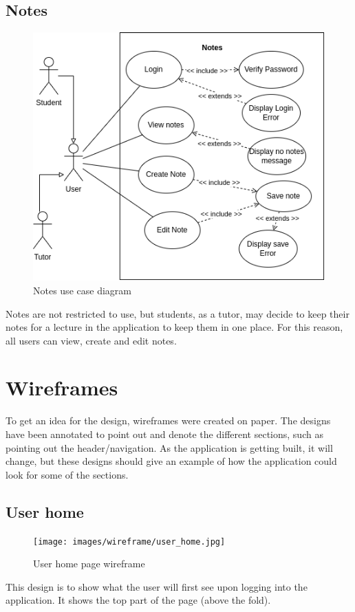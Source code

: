 \subsection{Notes}

\begin{figure}[H]
    \centering
    \includegraphics[scale=0.45]{images/use cases/notes.png}
    \caption{Notes use case diagram}
    \label{fig:my_label}
\end{figure}

Notes are not restricted to use, but students, as a tutor, may decide to keep their notes for a lecture in the application to keep them in one place. For this reason, all users can view, create and edit notes.

\section{Wireframes}

To get an idea for the design, wireframes were created on paper. The designs have been annotated to point out and denote the different sections, such as pointing out the header/navigation. As the application is getting built, it will change, but these designs should give an example of how the application could look for some of the sections.

\subsection{User home}
\begin{figure}[H]
    \centering
    \texttt{[image: images/wireframe/user\_home.jpg]}
    \caption{User home page wireframe}
    \label{fig:my_label}
\end{figure}
This design is to show what the user will first see upon logging into the application. It shows the top part of the page (above the fold).

